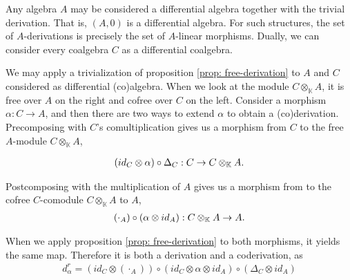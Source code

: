 \documentclass[../thesis.tex]{subfiles}
\begin{document}
            Any algebra $A$ may be considered a differential algebra together with the trivial derivation. That is, $(A, 0)$ is a differential algebra. For such structures, the set of $A$-derivations is precisely the set of $A$-linear morphisms. Dually, we can consider every coalgebra $C$ as a differential coalgebra. 
            
            We may apply a trivialization of proposition \ref{prop: free-derivation} to $A$ and $C$ considered as differential (co)algebra. When we look at the module $C\otimes_\mathbb{K}A$, it is free over $A$ on the right and cofree over $C$ on the left. Consider a morphism $\alpha: C \rightarrow A$, and then there are two ways to extend $\alpha$ to obtain a (co)derivation. Precomposing with $C$'s comultiplication gives us a morphism from $C$ to the free $A$-module $C\otimes_\mathbb{K} A$,

            \begin{align*}
                (id_C\otimes \alpha) \circ \Delta_C : C \rightarrow C \otimes_\mathbb{K} A\tt{.}
            \end{align*}

            Postcomposing with the multiplication of $A$ gives us a morphism from to the cofree $C$-comodule $C\otimes_\mathbb{K}A$ to $A$,
            \begin{align*}
                (\cdot_A) \circ (\alpha\otimes id_A) : C \otimes_\mathbb{K} A \rightarrow A\tt{.}
            \end{align*}

            When we apply proposition \ref{prop: free-derivation} to both morphisms, it yields the same map. Therefore it is both a derivation and a coderivation, as
            \begin{align*}
                d_\alpha^r = (id_C\otimes (\cdot_A)) \circ (id_C \otimes \alpha \otimes id_A) \circ (\Delta_C\otimes id_A)
            \end{align*}

            \begin{center}
            \end{center}
\end{document}
